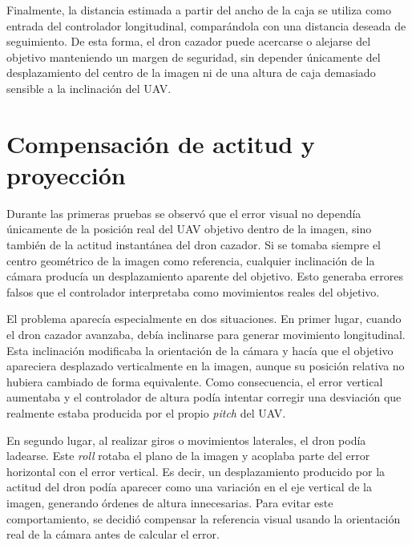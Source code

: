 \vspace{0.3cm}

Finalmente, la distancia estimada a partir del ancho de la caja se utiliza como entrada del controlador longitudinal, comparándola con una distancia deseada de seguimiento. De esta forma, el dron cazador puede acercarse o alejarse del objetivo manteniendo un margen de seguridad, sin depender únicamente del desplazamiento del centro de la imagen ni de una altura de caja demasiado sensible a la inclinación del UAV.

\section{Compensación de actitud y proyección}

Durante las primeras pruebas se observó que el error visual no dependía únicamente de la posición real del UAV objetivo dentro de la imagen, sino también de la actitud instantánea del dron cazador. Si se tomaba siempre el centro geométrico de la imagen como referencia, cualquier inclinación de la cámara producía un desplazamiento aparente del objetivo. Esto generaba errores falsos que el controlador interpretaba como movimientos reales del objetivo.

\vspace{0.3cm}

El problema aparecía especialmente en dos situaciones. En primer lugar, cuando el dron cazador avanzaba, debía inclinarse para generar movimiento longitudinal. Esta inclinación modificaba la orientación de la cámara y hacía que el objetivo apareciera desplazado verticalmente en la imagen, aunque su posición relativa no hubiera cambiado de forma equivalente. Como consecuencia, el error vertical aumentaba y el controlador de altura podía intentar corregir una desviación que realmente estaba producida por el propio \textit{pitch} del UAV.

\vspace{0.3cm}

En segundo lugar, al realizar giros o movimientos laterales, el dron podía ladearse. Este \textit{roll} rotaba el plano de la imagen y acoplaba parte del error horizontal con el error vertical. Es decir, un desplazamiento producido por la actitud del dron podía aparecer como una variación en el eje vertical de la imagen, generando órdenes de altura innecesarias. Para evitar este comportamiento, se decidió compensar la referencia visual usando la orientación real de la cámara antes de calcular el error.

